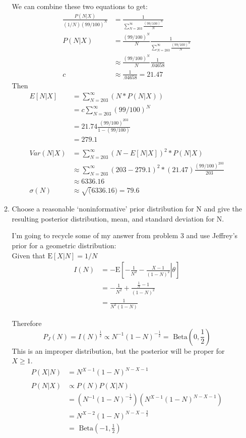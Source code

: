 \documentclass[11pt]{article}
\newcommand{\E}{\mathrm{E}}
\newcommand{\Beta}{\text{ Beta}}
\theoremstyle{definition}
\theoremstyle{remark}
\theoremstyle{definition}
\begin{document}
\begin{enumerate}
\begin{enumerate}
			We can combine these two equations to get:
			 \begin{align*}
				\frac{P(N|X)}{(1/N)(99/100)^N} &= \frac{1}{\sum_{N=203}^\infty \frac{(99/100)^N}{N}}\\
				P(N|X) &= \frac{(99/100)^N}{N} \frac{1}{\sum_{N=203}^\infty \frac{(99/100)^N}{N}} \\
				&\approx \frac{(99/100)^N}{N}\frac{1}{.04658} \\
				c &\approx \frac{1}{.04658} = 21.47
			\end{align*}
		Then 
		\begin{align*}
			E[N|X] &= \sum_{N=203}^\infty (N * P(N|X)) \\
			&= c \sum_{N=203}^\infty (99/100)^N\\
			&= 21.74 \frac{(99/100)^{203}}{1-(99/100)}\\
			&= 279.1\\
			& \\
			Var(N|X) 
			&= \sum_{N=203}^\infty (N-E[N|X])^2 * P(N|X) \\
			&\approx \sum_{N=203}^\infty (203-279.1)^2 * (21.47) \frac{(99/100)^{203}}{203}\\
			&\approx 6336.16\\
			\sigma(N) &\approx \sqrt(6336.16) = 79.6
		\end{align*} 
		
		\item  Choose a reasonable ‘noninformative’ prior distribution for N and give the resulting posterior distribution, mean, and standard deviation for N.
			
			I'm going to recycle some of my answer from problem 3 and use Jeffrey's prior for a geometric distribution:\\
			Given that $\E[X|N] = 1/N$
			\begin{align*}
	I(N) 
	&= -\E \left[ \left. -\frac{1}{N^2}-\frac{X-1}{(1-N)^2} \right| \theta \right]\\
	&= -\frac{1}{N^2}+\frac{\frac{1}{N}-1}{(1-N)^2}\\
	&= \frac{1}{N^2(1-N)}
\end{align*}

Therefore $$P_J(N) = I(N)^{\frac{1}{2}} \propto N^{-1}(1-N)^{-\frac{1}{2}}= \Beta \left(0,\frac{1}{2}\right)$$
This is an improper distribution, but the posterior will be proper for $X\geq1$.
			\begin{align*}
				P(X|N) &=  N^{X-1}(1-N)^{N-X-1}\\
				& \\
				P(N|X) &\propto P(N)P(X|N)\\
						&= (N^{-1}(1-N)^{-\frac{1}{2}})( N^{X-1}(1-N)^{N-X-1}) \\
				 		&=  N^{X-2}(1-N)^{N-X-\frac{3}{2}}\\
				 		&= \Beta (-1,\frac{1}{2})
			\end{align*}
			

\end{enumerate}
\end{enumerate}
\end{document}

